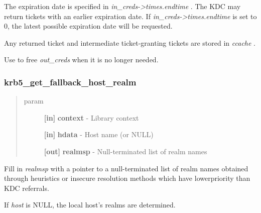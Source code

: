 \documentclass[letterpaper,10pt,english]{sphinxmanual}
\begin{document}
The expiration date is specified in \emph{in\_creds-\textgreater{}times.endtime} . The KDC may return tickets with an earlier expiration date. If \emph{in\_creds-\textgreater{}times.endtime} is set to 0, the latest possible expiration date will be requested.

Any returned ticket and intermediate ticket-granting tickets are stored in \emph{ccache} .

Use {\hyperref[appdev/refs/api/krb5_free_creds:krb5_free_creds]{}} to free \emph{out\_creds} when it is no longer needed.


\subsubsection{krb5\_get\_fallback\_host\_realm}
\label{appdev/refs/api/krb5_get_fallback_host_realm:krb5-get-fallback-host-realm}\label{appdev/refs/api/krb5_get_fallback_host_realm::doc}

\begin{fulllineitems}
\label{appdev/refs/api/krb5_get_fallback_host_realm:krb5_get_fallback_host_realm}
\end{fulllineitems}

\begin{quote}\begin{description}
\item[{param}] \leavevmode
\textbf{{[}in{]}} \textbf{context} - Library context

\textbf{{[}in{]}} \textbf{hdata} - Host name (or NULL)

\textbf{{[}out{]}} \textbf{realmsp} - Null-terminated list of realm names

\end{description}\end{quote}

Fill in \emph{realmsp} with a pointer to a null-terminated list of realm names obtained through heuristics or insecure resolution methods which have lowerpriority than KDC referrals.

If \emph{host} is NULL, the local host's realms are determined.
\end{document}
